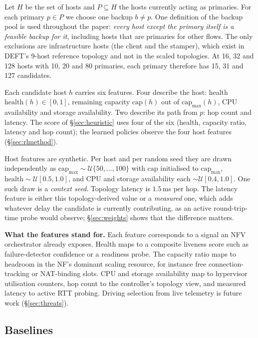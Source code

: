 \documentclass[journal]{IEEEtran}
\begin{document}
Let $H$ be the set of hosts and $P \subseteq H$ the hosts currently acting as
primaries. For each primary $p \in P$ we choose one backup $b \neq p$. One
definition of the backup pool is used throughout the paper: \emph{every host
except the primary itself is a feasible backup for it}, including hosts that are
primaries for other flows. The only exclusions are infrastructure hosts (the
client and the stamper), which exist in DEFT's 9-host reference topology and not
in the scaled topologies. At 16, 32 and 128 hosts with 10, 20 and 80 primaries,
each primary therefore has 15, 31 and 127 candidates.

Each candidate host $h$ carries six features. Four describe the host: health
$\mathrm{health}(h) \in [0,1]$, remaining capacity $\mathrm{cap}(h)$ out of
$\mathrm{cap}_{\max}(h)$, CPU availability and storage availability. Two
describe its path from $p$: hop count and latency. The score of
\S\ref{sec:heuristic} uses four of the six (health, capacity ratio, latency and
hop count); the learned policies observe the four host features
(\S\ref{sec:rlmethod}).

Host features are synthetic. Per host and per random seed they are drawn
independently as $\mathrm{cap}_{\max} \sim \mathcal{U}\{50,\dots,100\}$ with
$\mathrm{cap}$ initialised to $\mathrm{cap}_{\max}$,
$\mathrm{health} \sim \mathcal{U}[0.5,1.0]$, and CPU and storage availability
each $\sim \mathcal{U}[0.4,1.0]$. One such draw is a \emph{context seed}.
Topology latency is $1.5$\,ms per hop. The latency feature is either this
topology-derived value or a \emph{measured} one, which adds whatever delay the
candidate is currently contributing, as an active round-trip-time probe would
observe; \S\ref{sec:weights} shows that the difference matters.

\textbf{What the features stand for.} Each feature corresponds to a signal an
NFV orchestrator already exposes. Health maps to a composite liveness score such
as failure-detector confidence or a readiness probe. The capacity ratio maps to
headroom in the NF's dominant scaling resource, for instance free
connection-tracking or NAT-binding slots. CPU and storage availability map to
hypervisor utilisation counters, hop count to the controller's topology view,
and measured latency to active RTT probing. Driving selection from live
telemetry is future work (\S\ref{sec:threats}).

\subsection{Baselines}
\end{document}
